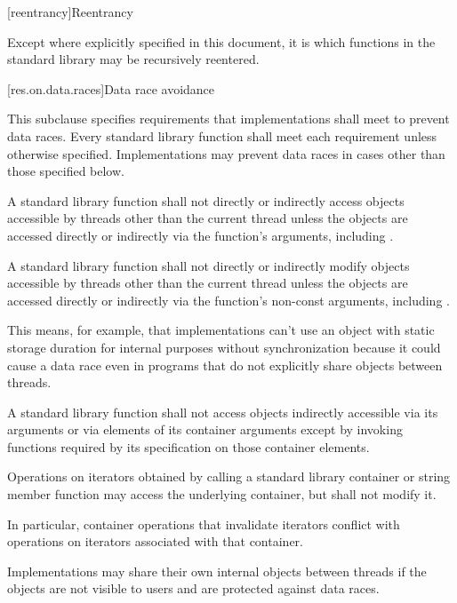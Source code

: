 [reentrancy]{Reentrancy}

\pnum
Except where explicitly specified in this document, it is  which functions in the \Cpp{} standard
library may be recursively reentered.

[res.on.data.races]{Data race avoidance}

\pnum
This subclause specifies requirements that implementations shall meet to prevent data
races.
Every standard library function shall meet each requirement unless otherwise specified.
Implementations may prevent data races in cases other than those specified below.

\pnum
A \Cpp{} standard library function shall not directly or indirectly access
objects accessible by threads other than the current thread
unless the objects are accessed directly or indirectly via the function's arguments,
including .

\pnum
A \Cpp{} standard library function shall not directly or indirectly modify
objects accessible by threads other than the current thread
unless the objects are accessed directly or indirectly via the function's non-const
arguments, including .

\pnum
\begin{note}
This means, for example, that implementations can't use an object with static storage duration for
internal purposes without synchronization because it could cause a data race even in
programs that do not explicitly share objects between threads.
\end{note}

\pnum
A \Cpp{} standard library function shall not access objects indirectly accessible via its
arguments or via elements of its container arguments except by invoking functions
required by its specification on those container elements.

\pnum
Operations on iterators obtained by calling a standard library container or string
member function may access the underlying container, but shall not modify it.
\begin{note}
In particular, container operations that invalidate iterators conflict
with operations on iterators associated with that container.
\end{note}

\pnum
Implementations may share their own internal objects between threads if the objects are
not visible to users and are protected against data races.

